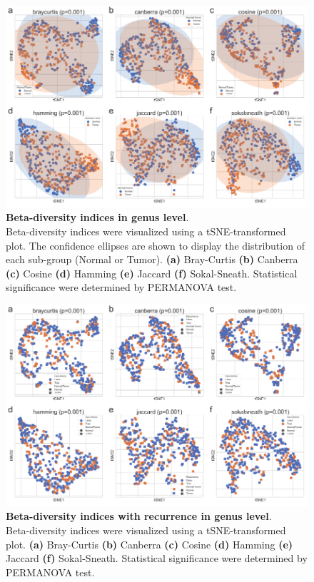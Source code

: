 \documentclass[11pt, a4paper, onecolumn, oneside]{report}
\begin{document}
            \begin{figure}[p]
                \centering
                \includegraphics[width=\linewidth]{Figures/CRC/Figure_05.pdf}
                \caption[Beta-diversity indices in genus level]{\textbf{Beta-diversity indices in genus level}.\\
                    Beta-diversity indices were visualized using a tSNE-transformed plot. The confidence ellipses are shown to display the distribution of each sub-group (Normal or Tumor). \textbf{(a)} Bray-Curtis \textbf{(b)} Canberra \textbf{(c)} Cosine \textbf{(d)} Hamming \textbf{(e)} Jaccard \textbf{(f)} Sokal-Sneath. Statistical significance were determined by PERMANOVA test.}
                \label{fig:CRC-beta}
            \end{figure}
            \clearpage

            \begin{figure}[p]
                \centering
                \includegraphics[width=\linewidth]{Figures/CRC/Figure_06.pdf}
                \caption[Beta-diversity indices with recurrence in genus level]{\textbf{Beta-diversity indices with recurrence in genus level}.\\
                    Beta-diversity indices were visualized using a tSNE-transformed plot. \textbf{(a)} Bray-Curtis \textbf{(b)} Canberra \textbf{(c)} Cosine \textbf{(d)} Hamming \textbf{(e)} Jaccard \textbf{(f)} Sokal-Sneath. Statistical significance were determined by PERMANOVA test.}
                \label{fig:CRC-beta-recurrence}
            \end{figure}
            \clearpage
\end{document}
